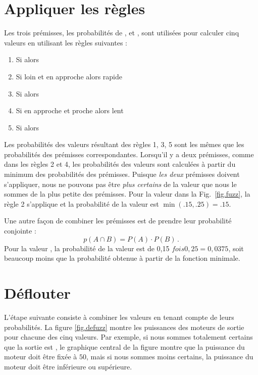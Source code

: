 \section{Appliquer les règles}

Les trois prémisses, les probabilités de ,  et , sont utilisées pour calculer cinq valeurs en utilisant les règles suivantes :

\begin{enumerate}
\item Si  alors 
\item Si loin et en approche alors rapide
\item Si  alors 
\item Si en approche et proche alors lent
\item Si  alors 
\end{enumerate}

Les probabilités des valeurs résultant des règles 1, 3, 5 sont les mêmes que les probabilités des prémisses correspondantes. Lorsqu'il y a deux prémisses, comme dans les règles 2 et 4, les probabilités des valeurs sont calculées à partir du minimum des probabilités des prémisses. Puisque \emph{les deux} prémisses doivent s'appliquer, nous ne pouvons pas être \emph{plus certains} de la valeur que nous le sommes de la plus petite des prémisses. Pour la valeur  dans la Fig.~\ref{fig.fuzz}, la règle 2 s'applique et la probabilité de la valeur est $\min(.15,.25)=.15$.

Une autre façon de combiner les prémisses est de prendre leur probabilité conjointe :
\[
p(A \cap B) = P(A)\cdot P(B)\,.
\]
Pour la valeur , la probabilité de la valeur est de 0,15 $ fois 0,25 = 0,0375 $, soit beaucoup moins que la probabilité obtenue à partir de la fonction minimale.

\section{Déflouter}

L'étape suivante consiste à combiner les valeurs en tenant compte de leurs probabilités. La figure \ref{fig.defuzz} montre les puissances des moteurs de sortie pour chacune des cinq valeurs. Par exemple, si nous sommes totalement certains que la sortie est , le graphique central de la figure montre que la puissance du moteur doit être fixée à $50$, mais si nous sommes moins certains, la puissance du moteur doit être inférieure ou supérieure.

